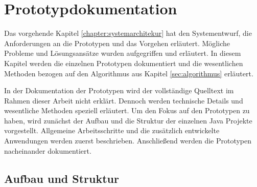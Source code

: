 \chapter{Prototypdokumentation}
\label{chapter:prototypeDocumentation}

Das vorgehende Kapitel \ref{chapter:systemarchitekur} hat den Systementwurf, die Anforderungen an die Prototypen und das Vorgehen erläutert. Mögliche Probleme und Lösungsansätze wurden aufgegriffen und erläutert. In diesem Kapitel werden die einzelnen Prototypen dokumentiert und die wesentlichen Methoden bezogen auf den Algorithmus aus Kapitel \ref{sec:algorithmus} erläutert. 

In der Dokumentation der Prototypen wird der vollständige Quelltext im Rahmen dieser Arbeit nicht erklärt. Dennoch werden technische Details und wesentliche Methoden speziell erläutert. Um den Fokus auf den Prototypen zu haben, wird zunächst der Aufbau und die Struktur der einzelnen Java Projekte vorgestellt. Allgemeine Arbeitsschritte und die zusätzlich entwickelte Anwendungen werden zuerst beschrieben. Anschließend werden die Prototypen nacheinander dokumentiert.


\section{Aufbau und Struktur}
\label{sec:prot:aufbauStruktur}

